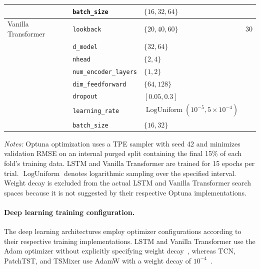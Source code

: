 \documentclass[runningheads,orivec]{llncs}
\begin{document}
\begin{table}[htbp]
\begin{tabular}{lllr}
     & \texttt{batch\_size}    & $\{16, 32, 64\}$                            & \\
\hline
Vanilla Transformer & \texttt{lookback}           & $\{20, 40, 60\}$                                   & 30 \\
                    & \texttt{d\_model}           & $\{32, 64\}$                                       & \\
                    & \texttt{nhead}              & $\{2, 4\}$                                         & \\
                    & \texttt{num\_encoder\_layers}& $\{1, 2\}$                                        & \\
                    & \texttt{dim\_feedforward}   & $\{64, 128\}$                                      & \\
                    & \texttt{dropout}            & $[0.05, 0.3]$                                      & \\
                    & \texttt{learning\_rate}      & $\operatorname{LogUniform}(10^{-5}, 5\times 10^{-4})$ & \\
                    & \texttt{batch\_size}         & $\{16, 32\}$                                       & \\
\hline
\end{tabular}
\par\vspace{4pt}\parbox{\linewidth}{\scriptsize\textit{Notes:} Optuna optimization uses a TPE sampler with seed 42 and minimizes validation RMSE on an internal purged split containing the final 15\% of each fold's training data. LSTM and Vanilla Transformer are trained for 15 epochs per trial. $\operatorname{LogUniform}$ denotes logarithmic sampling over the specified interval. Weight decay is excluded from the actual LSTM and Vanilla Transformer search spaces because it is not suggested by their respective Optuna implementations.}
\end{table}

\paragraph{Deep learning training configuration.} The deep learning architectures employ optimizer configurations according to their respective training implementations. LSTM and Vanilla Transformer use the Adam optimizer without explicitly specifying weight decay~\cite{kingma2014}, whereas TCN, PatchTST, and TSMixer use AdamW with a weight decay of $10^{-4}$~\cite{loshchilov2018decoupled}.
\end{document}

